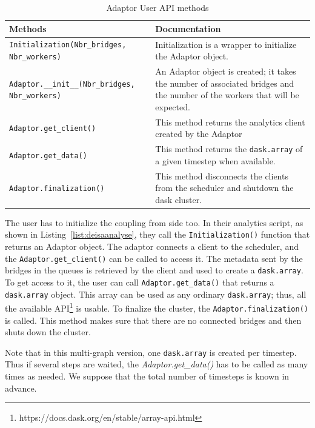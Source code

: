 \begin{table}[ht]  
\begin{tabular}{||  m{6cm}  m{9cm} ||} 
 \hline
Methods & Documentation\\
 \hline\hline
 \texttt{Initialization(Nbr\_bridges, Nbr\_workers) }& Initialization is a wrapper to initialize the Adaptor object.\\ 
 \hline\hline  
\texttt{Adaptor.\_\_init\_\_(Nbr\_bridges, Nbr\_workers)} & An Adaptor object is created; it takes the number of associated bridges and the number of the workers that will be expected. \\ 
 \hline\hline
 \texttt{Adaptor.get\_client()} & This method returns the analytics client created by the Adaptor\\
 \hline\hline
 \texttt{Adaptor.get\_data()} & This method returns the \texttt{dask.array} of a given timestep when available.\\
 \hline\hline
 \texttt{Adaptor.finalization()} &   This method disconnects the clients from the scheduler and shutdown the dask cluster. \\
 \hline
\end{tabular}
\caption{Adaptor User API methods}
\label{table:adaptor}
\end{table}

The user has to initialize the coupling from \dask side too. In their analytics script, as shown in Listing~\ref{list:deisaanalyse}, they call the \texttt{Initialization()} function that returns an Adaptor object. The adaptor connects a client to the scheduler, and the \texttt{Adaptor.get\_client()} can be called to access it. The metadata sent by the bridges in the queues is retrieved by the client and used to create a \texttt{dask.array}. To get access to it, the user can call \texttt{Adaptor.get\_data()} that returns a \texttt{dask.array} object. This array can be used as any ordinary \texttt{dask.array}; thus, all the available API\footnote{https://docs.dask.org/en/stable/array-api.html} is usable.  
To finalize the \dask cluster, the \texttt{Adaptor.finalization()} is called. This method makes sure that there are no connected bridges and then shuts down the cluster. 

Note that in this multi-graph version, one \texttt{dask.array} is created per timestep. Thus if several steps are waited, the \textit{Adaptor.get\_data()} has to be called as many times as needed. We suppose that the total number of timesteps is known in advance.

